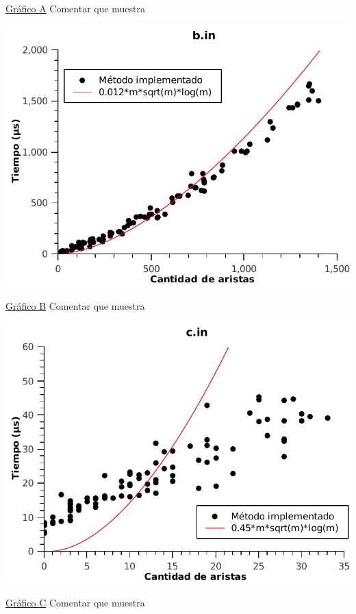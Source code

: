 \underline{Gráfico A} Comentar que muestra

 \vspace*{1cm}
\label{GraphB}
\hspace*{-2.1cm}\includegraphics[width=475pt]{../ej2/pruebas_graficos/GraphB.pdf}

\underline{Gráfico B} Comentar que muestra


 \vspace*{1cm}
\label{GraphC}
\hspace*{-2.1cm}\includegraphics[width=475pt]{../ej2/pruebas_graficos/GraphC.pdf}

\underline{Gráfico C} Comentar que muestra

 \vspace*{1cm}

